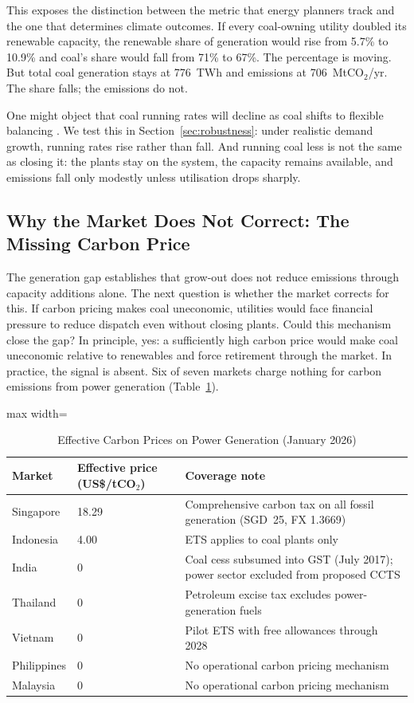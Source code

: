 \documentclass[review,3p,authoryear]{elsarticle}
\begin{document}
This exposes the distinction between the metric that energy planners track and the one that determines climate outcomes. If every coal-owning utility doubled its renewable capacity, the renewable share of generation would rise from 5.7\% to 10.9\% and coal's share would fall from 71\% to 67\%. The percentage is moving. But total coal generation stays at 776~TWh and emissions at 706~MtCO$_2$/yr. The share falls; the emissions do not.

One might object that coal running rates will decline as coal shifts to flexible balancing \citep{Ember2025}. We test this in Section~\ref{sec:robustness}: under realistic demand growth, running rates rise rather than fall. And running coal less is not the same as closing it: the plants stay on the system, the capacity remains available, and emissions fall only modestly unless utilisation drops sharply.

\subsection{Why the Market Does Not Correct: The Missing Carbon Price}
\label{sec:results_carbon}

The generation gap establishes that grow-out does not reduce emissions through capacity additions alone. The next question is whether the market corrects for this. If carbon pricing makes coal uneconomic, utilities would face financial pressure to reduce dispatch even without closing plants. Could this mechanism close the gap? In principle, yes: a sufficiently high carbon price would make coal uneconomic relative to renewables and force retirement through the market. In practice, the signal is absent. Six of seven markets charge nothing for carbon emissions from power generation (Table~\ref{tab:carbon_prices}).

\begin{table}[H]
\centering
\caption{Effective Carbon Prices on Power Generation (January 2026)}
\label{tab:carbon_prices}
\small
\begin{adjustbox}{max width=\linewidth}
\begin{tabular}{@{}lll@{}}
\toprule
\textbf{Market} & \textbf{Effective price (US\$/tCO$_2$)} & \textbf{Coverage note} \\
\midrule
Singapore & 18.29 & Comprehensive carbon tax on all fossil generation (SGD~25, FX 1.3669) \\
Indonesia & 4.00 & ETS applies to coal plants only \\
India & 0 & Coal cess subsumed into GST (July 2017); power sector excluded from proposed CCTS \\
Thailand & 0 & Petroleum excise tax excludes power-generation fuels \\
Vietnam & 0 & Pilot ETS with free allowances through 2028 \\
Philippines & 0 & No operational carbon pricing mechanism \\
Malaysia & 0 & No operational carbon pricing mechanism \\
\bottomrule
\end{tabular}
\end{adjustbox}
\end{table}
\end{document}
